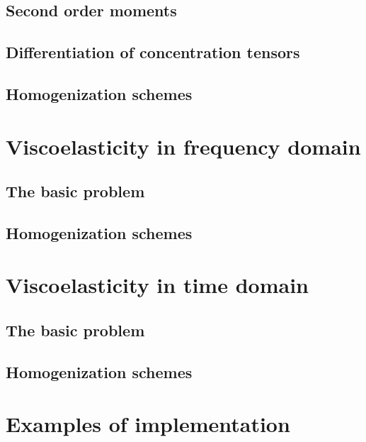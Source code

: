 \documentclass[
  letterpaper,
  DIV=11,
  numbers=noendperiod]{scrreprt}
\begin{document}
\hypertarget{sec-second_order_moments}{%
\chapter{Second order moments}\label{sec-second_order_moments}}

\hypertarget{sec-conc_tensor_deriv}{%
\chapter{Differentiation of concentration
tensors}\label{sec-conc_tensor_deriv}}

\hypertarget{sec-schemes_deriv}{%
\chapter{Homogenization schemes}\label{sec-schemes_deriv}}

\part{Viscoelasticity in frequency domain}

\hypertarget{sec-basics_freq}{%
\chapter{The basic problem}\label{sec-basics_freq}}

\hypertarget{sec-schemes_freq}{%
\chapter{Homogenization schemes}\label{sec-schemes_freq}}

\part{Viscoelasticity in time domain}

\hypertarget{sec-basics_time}{%
\chapter{The basic problem}\label{sec-basics_time}}

\hypertarget{sec-schemes_time}{%
\chapter{Homogenization schemes}\label{sec-schemes_time}}

\part{Examples of implementation}
\end{document}
